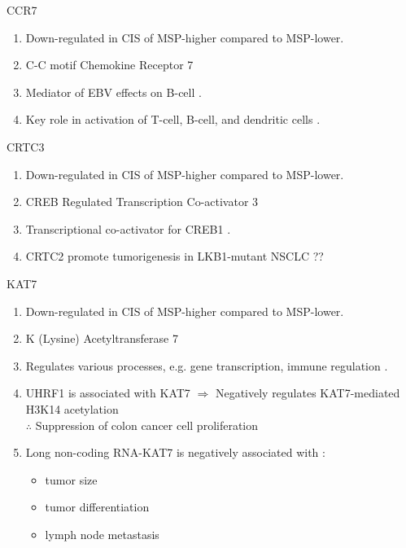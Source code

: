 \documentclass{beamer}
\begin{document}
\begin{frame}[allowframebreaks]
         \begin{block}{CCR7}
            \begin{enumerate}
                \item Down-regulated in CIS of MSP-higher compared to MSP-lower.
                \item C-C motif Chemokine Receptor 7
                \item Mediator of EBV effects on B-cell \cite{CCR7-1}.
                \item Key role in activation of T-cell, B-cell, and dendritic cells \cite{CCR7-2}.
            \end{enumerate}
        \end{block}

        \begin{block}{CRTC3}
            \begin{enumerate}
                \item Down-regulated in CIS of MSP-higher compared to MSP-lower.
                \item CREB Regulated Transcription Co-activator 3
                \item Transcriptional co-activator for CREB1 \cite{CRTC3-1}.
                \item CRTC2 promote tumorigenesis in LKB1-mutant NSCLC \cite{CRTC3-2} ??
            \end{enumerate}
        \end{block}

        \begin{block}{KAT7}
            \begin{enumerate}
                \item Down-regulated in CIS of MSP-higher compared to MSP-lower.
                \item K (Lysine) Acetyltransferase 7
                \item Regulates various processes, e.g. gene transcription, immune regulation \cite{KAT7-1}.
                \item UHRF1 is associated with KAT7 $\Rightarrow$ Negatively regulates KAT7-mediated H3K14 acetylation \\
                    $\therefore$ Suppression of colon cancer cell proliferation \cite{KAT7-2}
                \item Long non-coding RNA-KAT7 is negatively associated with \cite{KAT7-3}:
                \begin{itemize}
                    \item tumor size
                    \item tumor differentiation
                    \item lymph node metastasis
                \end{itemize}
            \end{enumerate}
        \end{block}


\end{frame}
\end{document}
